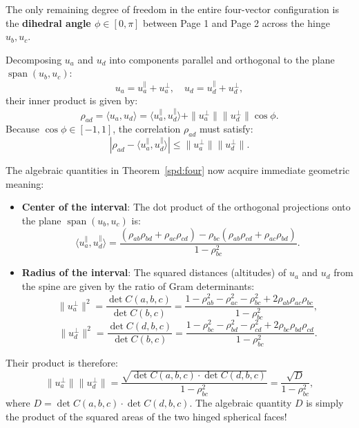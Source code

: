 \documentclass[a4paper]{article}
\begin{document}
The only remaining degree of freedom in the entire four-vector configuration is the \textbf{dihedral angle $\phi \in [0, \pi]$} between Page 1 and Page 2 across the hinge $u_b, u_c$. 

Decomposing $u_a$ and $u_d$ into components parallel and orthogonal to the plane $\operatorname{span}(u_b, u_c)$:
\begin{equation}
u_a = u_a^{\parallel} + u_a^{\perp}, \quad u_d = u_d^{\parallel} + u_d^{\perp},
\end{equation}
their inner product is given by:
\begin{equation}
\rho_{ad} = \langle u_a, u_d \rangle = \langle u_a^{\parallel}, u_d^{\parallel} \rangle + \|u_a^{\perp}\| \|u_d^{\perp}\| \cos \phi.
\end{equation}
Because $\cos \phi \in [-1, 1]$, the correlation $\rho_{ad}$ must satisfy:
\begin{equation}
\left| \rho_{ad} - \langle u_a^{\parallel}, u_d^{\parallel} \rangle \right| \leq \|u_a^{\perp}\| \|u_d^{\perp}\|.
\end{equation}

The algebraic quantities in Theorem~\ref{spd:four} now acquire immediate geometric meaning:
\begin{itemize}[leftmargin=*]
\item \textbf{Center of the interval}: The dot product of the orthogonal projections onto the plane $\operatorname{span}(u_b, u_c)$ is:
\begin{equation}
\langle u_a^{\parallel}, u_d^{\parallel} \rangle = \frac{(\rho_{ab}\rho_{bd} + \rho_{ac}\rho_{cd}) - \rho_{bc}(\rho_{ab}\rho_{cd} + \rho_{ac}\rho_{bd})}{1 - \rho_{bc}^2}.
\end{equation}
\item \textbf{Radius of the interval}: The squared distances (altitudes) of $u_a$ and $u_d$ from the spine are given by the ratio of Gram determinants:
\begin{equation}
\|u_a^{\perp}\|^2 = \frac{\det C(a, b, c)}{\det C(b, c)} = \frac{1 - \rho_{ab}^2 - \rho_{ac}^2 - \rho_{bc}^2 + 2\rho_{ab}\rho_{ac}\rho_{bc}}{1 - \rho_{bc}^2},
\end{equation}
\begin{equation}
\|u_d^{\perp}\|^2 = \frac{\det C(d, b, c)}{\det C(b, c)} = \frac{1 - \rho_{bc}^2 - \rho_{bd}^2 - \rho_{cd}^2 + 2\rho_{bc}\rho_{bd}\rho_{cd}}{1 - \rho_{bc}^2}.
\end{equation}
\end{itemize}
Their product is therefore:
\begin{equation}
\|u_a^{\perp}\| \|u_d^{\perp}\| = \frac{\sqrt{\det C(a, b, c) \cdot \det C(d, b, c)}}{1 - \rho_{bc}^2} = \frac{\sqrt{D}}{1 - \rho_{bc}^2},
\end{equation}
where $D = \det C(a, b, c) \cdot \det C(d, b, c)$. The algebraic quantity $D$ is simply the product of the squared areas of the two hinged spherical faces!
\end{document}
